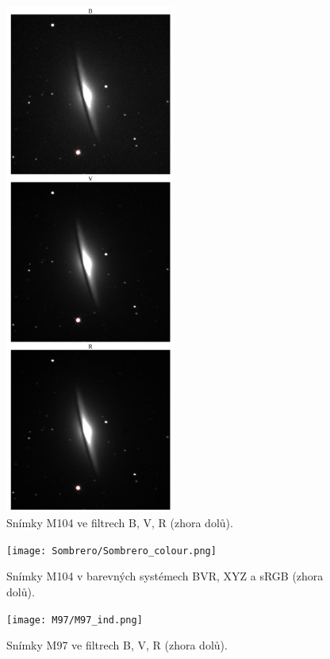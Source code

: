 \documentclass[a4paper,11pt,twocolumn]{article}
\begin{document}
    \begin{figure}
        \centering
        \includegraphics[width=0.5\textwidth]{Sombrero/Sombrero_ind.png}
        \caption{Snímky M104 ve filtrech B, V, R (zhora dolů).}
        \label{fig:sombrero_ind.png}
    \end{figure}

    \begin{figure}
        \centering
        \texttt{[image: Sombrero/Sombrero\_colour.png]}
        \caption{Snímky M104 v barevných systémech BVR, XYZ a sRGB (zhora dolů).}
        \label{fig:sombrero_colour.png}
    \end{figure}

    \begin{figure}
        \centering
        \texttt{[image: M97/M97\_ind.png]}
        \caption{Snímky M97 ve filtrech B, V, R (zhora dolů).}
        \label{fig:M97_ind.png}
    \end{figure}
\end{document}
